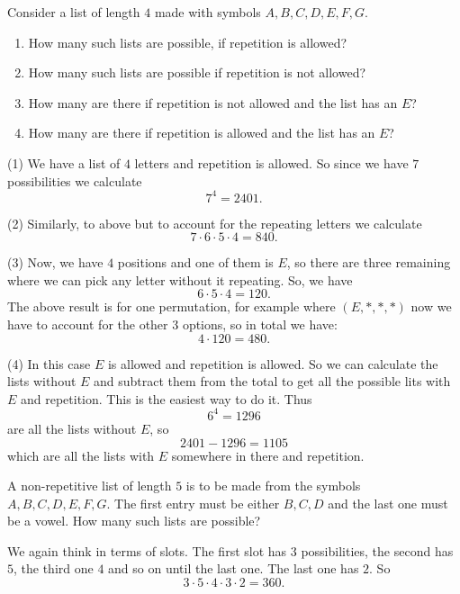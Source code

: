 \begin{example}
    Consider a list of length $4$ made with symbols $A,B,C,D,E,F,G$.
    \begin{enumerate}
        \item How many such lists are possible, if repetition is allowed? 
        \item How many such lists are possible if repetition is not allowed? 
        \item How many are there if repetition is not allowed and the list has an $E$? 
        \item How many are there if repetition is allowed and the list has an $E$? 
    \end{enumerate}
    \begin{solution}
        (1) We have a list of $4$ letters and repetition is allowed. So since we have $7$ possibilities we calculate 
        $$
        7^{4}=2401.
        $$
        
        (2) Similarly, to above but to account for the repeating letters we calculate 
        $$
        7\cdot 6 \cdot 5 \cdot 4=840.
        $$
        
        (3) Now, we have $4$ positions and one of them is $E$, so there are three remaining where we can pick any letter without it repeating. So, we have 
        $$
        6\cdot 5 \cdot 4 = 120.
        $$
        The above result is for one permutation, for example where $(E,\ast, \ast, \ast)$ now we have to account for the other 3 options, so in total we have: 
        $$
        4\cdot 120 = 480.
        $$
        
        (4) In this case $E$ is allowed and repetition is allowed. So we can calculate the lists without $E$ and subtract them from the total to get all the possible lits with $E$ and repetition. This is the easiest way to do it. Thus 
        $$
        6^{4}=1296
        $$
        are all the lists without $E$, so 
        $$
        2401-1296=1105
        $$
        which are all the lists with $E$ somewhere in there and repetition. 
    \end{solution}
\end{example}

\begin{example}
    A non-repetitive list of length $5$ is to be made from the symbols $A,B,C,D,E,F,G$. The first entry must be either $B,C,D$ and the last one must be a vowel. How many such lists are possible? 
    \begin{solution}
        We again think in terms of slots. The first slot has $3$ possibilities, the second has $5$, the third one $4$ and so on until the last one. The last one has $2$. So 
        $$
        3\cdot 5\cdot 4 \cdot 3\cdot 2=360.
        $$
    \end{solution}
\end{example}
